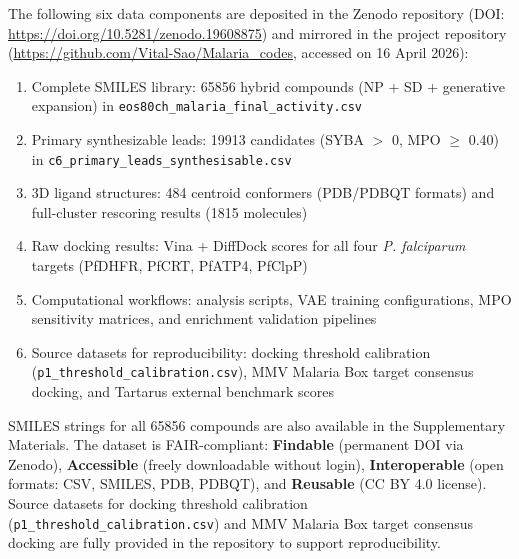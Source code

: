 \documentclass[journal=jcisd8,manuscript=article]{achemso}
\begin{document}
The following six data components are deposited in the Zenodo repository (DOI: \url{https://doi.org/10.5281/zenodo.19608875}) and mirrored in the project repository (\url{https://github.com/Vital-Sao/Malaria_codes}, accessed on 16 April 2026):
\begin{enumerate}
    \item Complete SMILES library: \num{65856} hybrid compounds (NP + SD + generative expansion) in \texttt{eos80ch\_malaria\_final\_activity.csv}
    \item Primary synthesizable leads: \num{19913} candidates (SYBA $>$ 0, MPO $\geq$ 0.40) in \texttt{c6\_primary\_leads\_synthesisable.csv}
    \item 3D ligand structures: \num{484} centroid conformers (PDB/PDBQT formats) and full-cluster rescoring results (\num{1815} molecules)
    \item Raw docking results: Vina + DiffDock scores for all four \textit{P. falciparum} targets (PfDHFR, PfCRT, PfATP4, PfClpP)
    \item Computational workflows: analysis scripts, VAE training configurations, MPO sensitivity matrices, and enrichment validation pipelines
    \item Source datasets for reproducibility: docking threshold calibration (\texttt{p1\_threshold\_calibration.csv}), MMV Malaria Box target consensus docking, and Tartarus external benchmark scores
\end{enumerate}
SMILES strings for all \num{65856} compounds are also available in the Supplementary Materials. The dataset is FAIR-compliant: \textbf{Findable} (permanent DOI via Zenodo), \textbf{Accessible} (freely downloadable without login), \textbf{Interoperable} (open formats: CSV, SMILES, PDB, PDBQT), and \textbf{Reusable} (CC BY 4.0 license). Source datasets for docking threshold calibration (\texttt{p1\_threshold\_calibration.csv}) and MMV Malaria Box target consensus docking are fully provided in the repository to support reproducibility.
\end{document}

